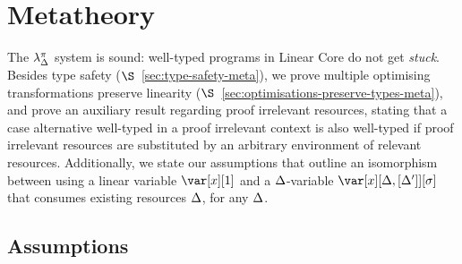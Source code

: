 \documentclass[acmsmall,review]{acmart}
\newtheorem{lemma}{Lemma}%
\begin{document}

\section{Metatheory\label{sec:main:metatheory}}

The $\lambda^\pi_\Delta$ system is sound: well-typed programs in Linear Core do not
get \emph{stuck}. Besides type safety ($\S$~\ref{sec:type-safety-meta}), we
prove multiple optimising transformations preserve linearity
($\S$~\ref{sec:optimisations-preserve-types-meta}), and prove an auxiliary
result regarding proof irrelevant resources, stating that a case alternative
well-typed in a proof irrelevant context is also well-typed if proof irrelevant
resources are substituted by an arbitrary environment of relevant resources.
%
Additionally, we state our assumptions that outline an isomorphism between
using a linear variable $\xl$ and a $\Delta$-variable $\xD$ that consumes existing
resources $\Delta$, for any $\Delta$.

\subsection{Assumptions}

\renewcommand{\DeltaLinearRelationLemma}{
\begin{lemma}[$\D \Rightarrow 1$]
Any $\Delta$-variable with a fully-irrelevant usage environment can be made a linear variable as long as its irrelevant environment is dropped from the linear environment (and the unrestricted env. is updated accordingly).\\
If $\G,\x[\irr{\D}]; \irr{\D},\D' \vdash e : \vp$
then $\G[x/\irr{\D}]; \D',\xl \vdash e :\vp$.
\end{lemma}
}

\renewcommand{\LinearDeltaRelationLemma}{
\begin{lemma}[$1 \Rightarrow \D$]
A linear variable can be moved to the unrestricted context as a $\D$-var with any usage environment $\D$ by introducing $\D$ in the linear resources (and the unrestricted env. is updated accordingly).\\
If $\G; \D',\xl \vdash e :\vp$
then $\G[\D/x],\xD; \D,\D' \vdash e : \vp$.
\end{lemma}
}
\end{document}
